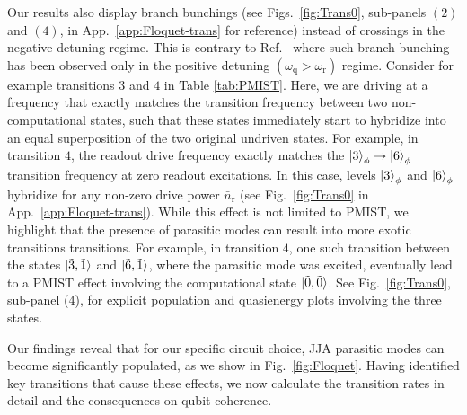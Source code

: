 \documentclass[%
reprint,
superscriptaddress,
 amsmath,amssymb,
 aps,
 prx,
longbibliography,
floatfix,
]{revtex4-2}
\begin{document}
Our results also display branch bunchings (see Figs.~\ref{fig:Trans0}, sub-panels $(2)$ and $(4)$, in App.~\ref{app:Floquet-trans} for reference) instead of crossings in the negative detuning regime. This is contrary to Ref.~\cite{dumas2024unified} where such branch bunching has been observed only in the positive detuning $(\omega_\textrm{q}>\omega_\textrm{r})$ regime.  Consider for example transitions $3$ and $4$ in Table \ref{tab:PMIST}. Here, we are  driving at a frequency that exactly matches the transition frequency between two non-computational states, such that these states immediately start to hybridize into an equal superposition of the two 
original undriven states.  For example, in transition $4$, the readout drive frequency exactly matches the $\ket{3}_\phi \rightarrow \ket{6}_\phi$ transition frequency at zero readout excitations. In this case, levels $\ket{3}_\phi$ and $\ket{6}_\phi$ hybridize for any non-zero drive power $\bar n_\textrm{r}$  (see Fig.~\ref{fig:Trans0} in App.~\ref{app:Floquet-trans}). While this effect is not limited to PMIST, we highlight that the presence of parasitic modes can result into more exotic transitions transitions. For example, in transition  $4$, one such transition between the states $\ket{\tilde{3},\tilde{1}}$ and $\ket{\tilde{6},\tilde{1}}$, where the parasitic mode was excited, eventually lead to a PMIST effect involving the computational state $\ket{\tilde{0},\tilde{0}}$. See Fig.~\ref{fig:Trans0}, sub-panel ($4$), for explicit population and quasienergy plots involving the three states.


Our findings reveal that for our specific circuit choice, JJA parasitic modes can become significantly populated, as we show in Fig.~\ref{fig:Floquet}. Having identified key transitions that cause these effects, we now calculate the transition rates in detail and the consequences on qubit coherence.
\end{document}

